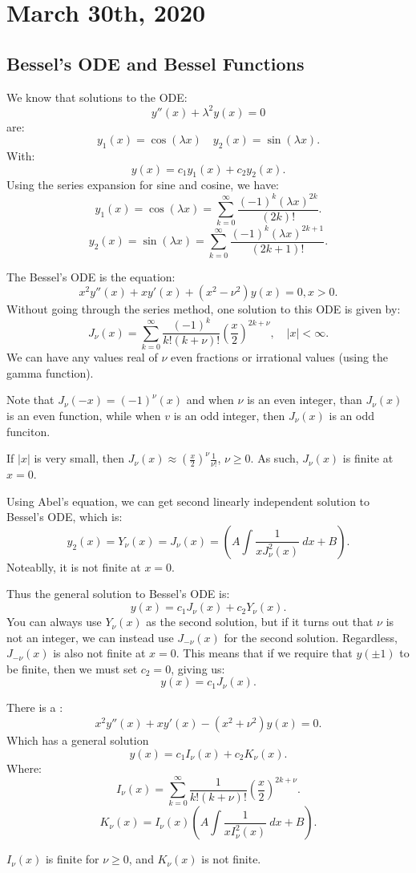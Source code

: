 \documentclass[../main/main.tex]{subfiles}
\begin{document}
\section{March 30th, 2020}
\subsection{Bessel's ODE and Bessel Functions}
We know that solutions to the ODE: \[
	y''(x) +\lambda^2y(x) = 0
\] are: \[
y_1(x) = \cos(\lambda x)\quad y_2(x) = \sin(\lambda x)
.\] With: \[
y(x) = c_1y_1(x) + c_2y_2(x)
.\] Using the series expansion for sine and cosine, we have: \[ 
y_1(x) = \cos(\lambda x) = \sum_{k=0}^{\infty}  \frac{(-1)^k (\lambda x)^{2k}}{(2k)!}
.\] \[
y_2(x) = \sin(\lambda x) = \sum_{k=0}^{\infty} \frac{(-1)^{k}(\lambda x)^{2k+1}}{(2k+1)!}
.\] 

The Bessel's ODE is the equation: \[
	x^2y''(x) + xy'(x) + (x^2-\nu^2)y(x) = 0, x>0
.\] Without going through the series method, one solution to this ODE is given by: \[
J_\nu (x) = \sum_{k=0}^{\infty} \frac{(-1)^{k}}{k!(k+\nu)!}\left( \frac{x}{2} \right) ^{2k+\nu}, \quad |x|<\infty
.\] We can have any values real of $\nu$ even fractions or irrational values (using the gamma function).
\begin{remark}
	Note that $J_\nu(-x) = (-1)^{\nu}(x)$ and when $\nu$ is an even integer, than $J_\nu(x)$ is an even function, while when $v$ is an odd integer, then $J_\nu(x)$ is an odd funciton.
\end{remark}
\begin{remark}
	If $|x|$ is very small, then $J_\nu(x) \approx \left( \frac{x}{2} \right) ^{\nu}\frac{1}{\nu!}$, $\nu\ge 0$. As such, $J_\nu(x)$ is finite at $x=0$.
\end{remark}
Using Abel's equation, we can get second linearly independent solution to Bessel's ODE, which is: \[
	y_2(x) = Y_\nu(x) = J_\nu(x) = \left( A \int \frac{1}{xJ_\nu^2(x)}~dx+B \right) 
.\] Noteablly, it is not finite at $x=0$.

Thus the general solution to Bessel's ODE is:  \[
	y(x) = c_1J_\nu(x) + c_2Y_\nu(x)
.\] You can always use $Y_\nu(x) $ as the second solution, but if it turns out that $\nu$ is not an integer, we can instead use $J_{-\nu}(x)$ for the second solution. Regardless, $J_{-\nu}(x)$ is also not finite at $x=0$. This means that if we require that $y(\pm 1) $ to be finite, then we must set $c_2=0$, giving us: \[
y(x) = c_1 J_{\nu}(x)
.\] 

There is a : \[
	x^2y''(x) + xy'(x) - (x^2+\nu^2) y(x) = 0
.\] Which has a general solution \[
y(x) = c_1I_\nu(x) + c_2K_\nu(x)
.\] Where: \[
I_\nu(x) = \sum_{k=0}^{\infty} \frac{1}{k!(k+\nu)!}\left( \frac{x}{2} \right) ^{2k+\nu}
.\] \[
K_\nu(x) = I_\nu(x) \left( A \int \frac{1}{x I^2_\nu(x)} ~dx +B\right) 
.\] 
\begin{remark}
	$I_\nu(x) $ is finite for $\nu\ge 0$, and $K_\nu(x) $ is not finite.
\end{remark}
\end{document}
